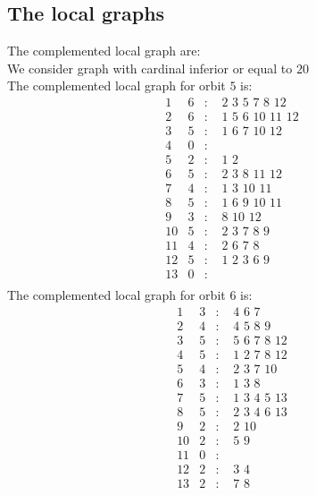 \documentclass[12pt]{article}
\begin{document}
\subsection{The local graphs}
The complemented local graph are:\\
We consider graph with cardinal inferior or equal to $20$\\
The complemented local graph for orbit $5$ is:
\begin{equation*}
\begin{array}{rrcl}
1&6&:&\,\,2\,\,3\,\,5\,\,7\,\,8\,\,12\\
2&6&:&\,\,1\,\,5\,\,6\,\,10\,\,11\,\,12\\
3&5&:&\,\,1\,\,6\,\,7\,\,10\,\,12\\
4&0&:&\\
5&2&:&\,\,1\,\,2\\
6&5&:&\,\,2\,\,3\,\,8\,\,11\,\,12\\
7&4&:&\,\,1\,\,3\,\,10\,\,11\\
8&5&:&\,\,1\,\,6\,\,9\,\,10\,\,11\\
9&3&:&\,\,8\,\,10\,\,12\\
10&5&:&\,\,2\,\,3\,\,7\,\,8\,\,9\\
11&4&:&\,\,2\,\,6\,\,7\,\,8\\
12&5&:&\,\,1\,\,2\,\,3\,\,6\,\,9\\
13&0&:&\\
\end{array}
\end{equation*}
The complemented local graph for orbit $6$ is:
\begin{equation*}
\begin{array}{rrcl}
1&3&:&\,\,4\,\,6\,\,7\\
2&4&:&\,\,4\,\,5\,\,8\,\,9\\
3&5&:&\,\,5\,\,6\,\,7\,\,8\,\,12\\
4&5&:&\,\,1\,\,2\,\,7\,\,8\,\,12\\
5&4&:&\,\,2\,\,3\,\,7\,\,10\\
6&3&:&\,\,1\,\,3\,\,8\\
7&5&:&\,\,1\,\,3\,\,4\,\,5\,\,13\\
8&5&:&\,\,2\,\,3\,\,4\,\,6\,\,13\\
9&2&:&\,\,2\,\,10\\
10&2&:&\,\,5\,\,9\\
11&0&:&\\
12&2&:&\,\,3\,\,4\\
13&2&:&\,\,7\,\,8\\
\end{array}
\end{equation*}
\end{document}

